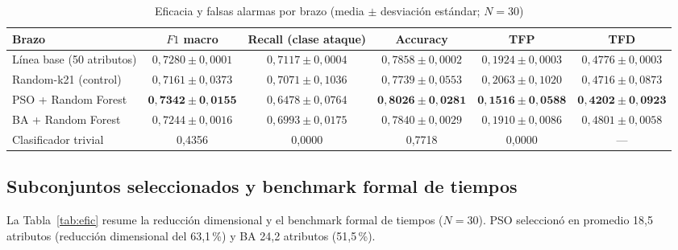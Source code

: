 \documentclass[11pt,a4paper]{article}
\newcommand{\tabfont}{\small\setstretch{1}}
\begin{document}
\begin{table}[ht]
\tabfont
\caption{Eficacia y falsas alarmas por brazo (media $\pm$ desviación estándar; $N = 30$)}
\label{tab:efi}
\begin{tabular}{@{}lccccc@{}}
\toprule
Brazo & $F1$ macro & Recall (clase ataque) & Accuracy & TFP & TFD \\
\midrule
Línea base (50 atributos) & $0{,}7280 \pm 0{,}0001$ & $0{,}7117 \pm 0{,}0004$ & $0{,}7858 \pm 0{,}0002$ & $0{,}1924 \pm 0{,}0003$ & $0{,}4776 \pm 0{,}0003$ \\
Random-k21 (control)      & $0{,}7161 \pm 0{,}0373$ & $0{,}7071 \pm 0{,}1036$ & $0{,}7739 \pm 0{,}0553$ & $0{,}2063 \pm 0{,}1020$ & $0{,}4716 \pm 0{,}0873$ \\
PSO + Random Forest       & $\mathbf{0{,}7342 \pm 0{,}0155}$ & $0{,}6478 \pm 0{,}0764$ & $\mathbf{0{,}8026 \pm 0{,}0281}$ & $\mathbf{0{,}1516 \pm 0{,}0588}$ & $\mathbf{0{,}4202 \pm 0{,}0923}$ \\
BA + Random Forest        & $0{,}7244 \pm 0{,}0016$ & $0{,}6993 \pm 0{,}0175$ & $0{,}7840 \pm 0{,}0029$ & $0{,}1910 \pm 0{,}0086$ & $0{,}4801 \pm 0{,}0058$ \\
Clasificador trivial      & 0,4356 & 0,0000 & 0,7718 & 0,0000 & — \\
\bottomrule
\end{tabular}
\end{table}

\subsection{Subconjuntos seleccionados y benchmark formal de tiempos}
La Tabla~\ref{tab:efic} resume la reducción dimensional y el benchmark formal de tiempos ($N=30$). PSO seleccionó en promedio 18,5 atributos (reducción dimensional del 63,1\,\%) y BA 24,2 atributos (51,5\,\%).
\end{document}
